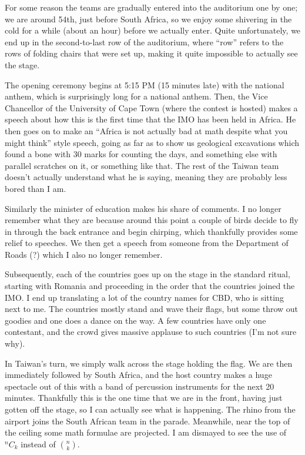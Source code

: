 \documentclass[11pt]{scrreprt}
\numberwithin{figure}{chapter}
\begin{document}
For some reason the teams are gradually entered into the auditorium one by one; we are around 54th, just before South Africa,
so we enjoy some shivering in the cold for a while (about an hour) before we actually enter.
Quite unfortunately, we end up in the second-to-last row of the auditorium, where ``row'' refers to the rows of folding chairs
that were set up, making it quite impossible to actually see the stage.

The opening ceremony begins at 5:15 PM (15 minutes late)  with the national anthem, which is surprisingly long for a national anthem.
Then, the Vice Chancellor of the University of Cape Town (where the contest is hosted) makes a speech about how this is the
first time that the IMO has been held in Africa. He then goes on to make an ``Africa is not actually bad at math despite
what you might think'' style speech, going as far as to show us geological excavations which found a bone with 30 marks for
counting the days, and something else with parallel scratches on it, or something like that. The rest of the Taiwan team doesn't
actually understand what he is saying, meaning they are probably less bored than I am.

Similarly the minister of education makes his share of comments. I no longer remember what they are because around this point
a couple of birds decide to fly in through the back entrance and begin chirping, which thankfully provides some relief to speeches.
We then get a speech from someone from the Department of Roads (?) which I also no longer remember.

Subsequently, each of the countries goes up on the stage in the standard ritual, starting with Romania and proceeding in the order
that the countries joined the IMO. I end up translating a lot of the country names for CBD, who is sitting next to me.
The countries mostly stand and wave their flags, but some throw out goodies and one does a dance on the way.
A few countries have only one contestant, and the crowd gives massive applause to such countries (I'm not sure why).

In Taiwan's turn, we simply walk across the stage holding the flag. We are then immediately followed by South Africa, and
the host country makes a huge spectacle out of this with a band of percussion instruments for the next 20 minutes. Thankfully
this is the one time that we are in the front, having just gotten off the stage, so I can actually see what is happening.
The rhino from the airport joins the South African team in the parade.
Meanwhile, near the top of the ceiling some math formulae are projected.
I am dismayed to see the use of $^nC_k$ instead of $\binom nk$.
\end{document}
